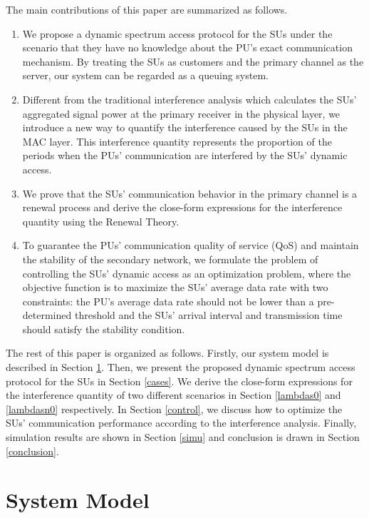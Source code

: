 \documentclass[11pt,draftcls]{IEEEtran}{\onecolumn}
\begin{document}
The main contributions of this paper are summarized as follows.
\begin{enumerate}
\item We propose a dynamic spectrum access protocol for the SUs under
the scenario that they have no knowledge about the PU's exact
communication mechanism. By treating the SUs as customers and
the primary channel as the server, our system can be regarded as
a queuing system.

\item Different from the traditional interference analysis which
calculates the SUs' aggregated signal power at the primary
receiver in the physical layer, we introduce a new way to
quantify the interference caused by the SUs in the MAC layer.
This interference quantity represents the proportion of the
periods when the PUs' communication are interfered by the SUs'
dynamic access.

\item We prove that the SUs' communication behavior in the primary
channel is a renewal process and derive the close-form
expressions for the interference quantity using the Renewal
Theory.

\item To guarantee the PUs' communication quality of service (QoS) and
maintain the stability of the secondary network, we formulate
the problem of controlling the SUs' dynamic access as an
optimization problem, where the objective function is to
maximize the SUs' average data rate with two constraints: the
PU's average data rate should not be lower than a pre-determined
threshold and the SUs' arrival interval and transmission time
should satisfy the stability condition.
\end{enumerate}

The rest of this paper is organized as follows. Firstly, our system
model is described in Section \ref{system}. Then, we present the
proposed dynamic spectrum access protocol for the SUs in Section
\ref{cases}. We derive the close-form expressions for the
interference quantity of two different scenarios in Section
\ref{lambdas0} and \ref{lambdasn0} respectively. In Section
\ref{control}, we discuss how to optimize the SUs' communication
performance according to the interference analysis. Finally,
simulation results are shown in Section \ref{simu} and conclusion is
drawn in Section\,\ref{conclusion}.

\section{System Model}\label{system}
\end{document}
